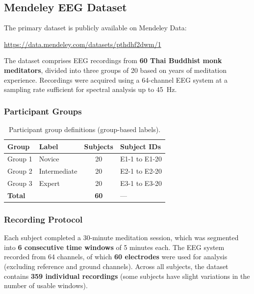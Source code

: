\documentclass[12pt,a4paper]{article}
\begin{document}
\subsection{Mendeley EEG Dataset}

The primary dataset is publicly available on Mendeley Data:

\begin{center}
\url{https://data.mendeley.com/datasets/pthdhf2dwm/1}
\end{center}

\noindent The dataset comprises EEG recordings from \textbf{60 Thai Buddhist monk meditators}, divided into three groups of 20 based on years of meditation experience. Recordings were acquired using a 64-channel EEG system at a sampling rate sufficient for spectral analysis up to 45~Hz.

\subsubsection{Participant Groups}

\begin{table}[H]
\centering
\caption{Participant group definitions (group-based labels).}
\label{tab:groups}
\begin{tabular}{llcl}
\toprule
\textbf{Group} & \textbf{Label} & \textbf{Subjects} & \textbf{Subject IDs} \\
\midrule
Group 1 & Novice       & 20 & E1-1 to E1-20 \\
Group 2 & Intermediate & 20 & E2-1 to E2-20 \\
Group 3 & Expert       & 20 & E3-1 to E3-20 \\
\midrule
\multicolumn{2}{l}{\textbf{Total}} & \textbf{60} & --- \\
\bottomrule
\end{tabular}
\end{table}

\subsubsection{Recording Protocol}

Each subject completed a 30-minute meditation session, which was segmented into \textbf{6 consecutive time windows} of 5 minutes each. The EEG system recorded from 64 channels, of which \textbf{60 electrodes} were used for analysis (excluding reference and ground channels). Across all subjects, the dataset contains \textbf{359 individual recordings} (some subjects have slight variations in the number of usable windows).
\end{document}
